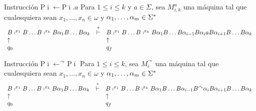 \begin{frame}
	\begin{block}{Instrucción $\mathrm{P}\bar{\imath} \leftarrow \mathrm{P}\bar{\imath}.a$}
		\PN Para $1 \leq i \leq k$ y $a \in \Sigma $, sea $M_{i,k}^{a}$ una máquina tal que cualesquiera sean $x_{1},
    \dotsc, x_{n} \in \omega$ y $\alpha_{1}, \dotsc,\alpha_{m} \in \Sigma^{\ast}$
		\minLetter
		\[
			\begin{array}{lcl}
				B \shortmid^{x_{1}} B \dotsc B \shortmid^{x_{k}} B \alpha_{1} B \dotsc B \alpha_{k} &\overset{\ast}{\vdash}& B
					\shortmid^{x_{1}} B \dotsc B \shortmid^{x_{k}} B \alpha_{1} B \dotsc B \alpha_{i-1} B \alpha_{i} a B
					\alpha_{i+1} B \dotsc B \alpha_{k} \\
				\uparrow && \uparrow \\
				q_{0} && q_{f}
			\end{array}
		\]
	\end{block}

  \normLetter
  \begin{block}{Instrucción $\mathrm{P}\bar{\imath} \leftarrow ^{\curvearrowright}\mathrm{P}\bar{\imath}$}
    \PN Para $1 \leq i \leq k$, sea $M_{i}^{\curvearrowright}$ una máquina tal que cualesquiera sean $x_{1}, \dotsc,
    x_{n} \in \omega$ y $\alpha_{1}, \dotsc,\alpha_{m} \in \Sigma^{\ast}$
    \minLetter
    \[
      \begin{array}{lcl}
        B \shortmid^{x_{1}} B \dotsc B \shortmid^{x_{k}} B \alpha_{1} B \dotsc B \alpha_{k} &\overset{\ast}{\vdash}& B
          \shortmid^{x_{1}} B \dotsc B \shortmid^{x_{k}} B \alpha_{1} B \dotsc B \alpha_{i-1} B^{\curvearrowright}
          \alpha_{i} B \alpha_{i+1} B \dotsc B \alpha_{k} \\
        \uparrow && \uparrow \\
        q_{0} && q_{f}
      \end{array}
    \]
  \end{block}
\end{frame}
